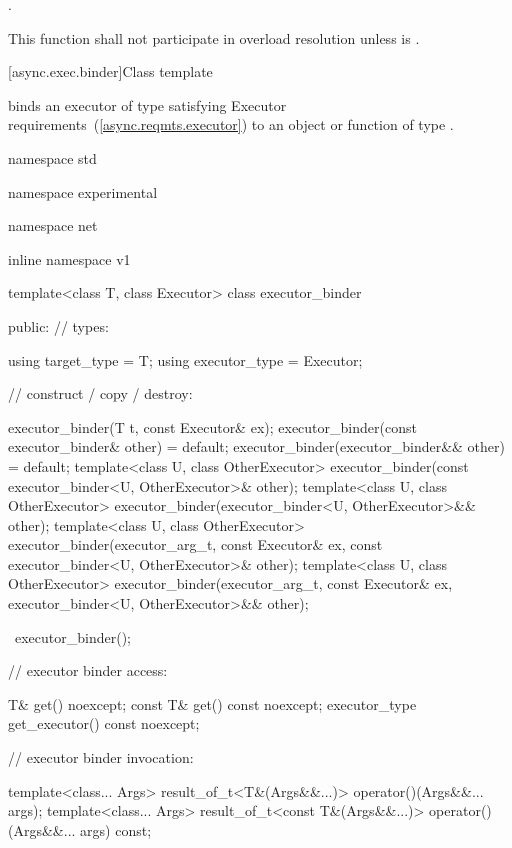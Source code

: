 \begin{itemdescr}
\pnum
\returns {}.

\pnum
\remarks This function shall not participate in overload resolution unless  is .
\end{itemdescr}



[async.exec.binder]{Class template }

%
\pnum
{} binds an executor of type  satisfying Executor requirements~(\ref{async.reqmts.executor}) to an object or function of type .

\begin{codeblock}
namespace std {
namespace experimental {
namespace net {
inline namespace v1 {

  template<class T, class Executor>
  class executor_binder
  {
  public:
    // types:

    using target_type = T;
    using executor_type = Executor;

    // construct / copy / destroy:

    executor_binder(T t, const Executor& ex);
    executor_binder(const executor_binder& other) = default;
    executor_binder(executor_binder&& other) = default;
    template<class U, class OtherExecutor>
      executor_binder(const executor_binder<U, OtherExecutor>& other);
    template<class U, class OtherExecutor>
      executor_binder(executor_binder<U, OtherExecutor>&& other);
    template<class U, class OtherExecutor>
      executor_binder(executor_arg_t, const Executor& ex,
        const executor_binder<U, OtherExecutor>& other);
    template<class U, class OtherExecutor>
      executor_binder(executor_arg_t, const Executor& ex,
        executor_binder<U, OtherExecutor>&& other);

    ~executor_binder();

    // executor binder access:

    T& get() noexcept;
    const T& get() const noexcept;
    executor_type get_executor() const noexcept;

    // executor binder invocation:

    template<class... Args>
      result_of_t<T&(Args&&...)> operator()(Args&&... args);
    template<class... Args>
      result_of_t<const T&(Args&&...)> operator()(Args&&... args) const;

}}}}}
\end{codeblock}
